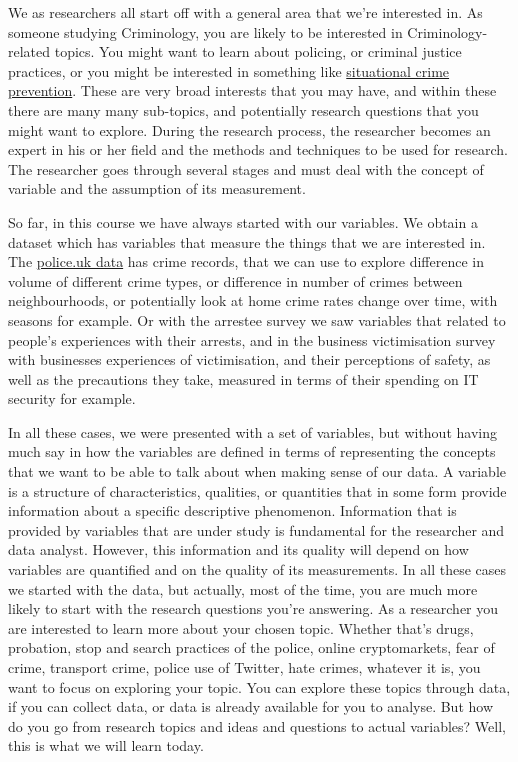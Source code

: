 \documentclass[
]{book}
\begin{document}
We as researchers all start off with a general area that we're interested in. As someone studying Criminology, you are likely to be interested in Criminology-related topics. You might want to learn about policing, or criminal justice practices, or you might be interested in something like \href{http://criminology.oxfordre.com/view/10.1093/acrefore/9780190264079.001.0001/acrefore-9780190264079-e-3}{situational crime prevention}. These are very broad interests that you may have, and within these there are many many sub-topics, and potentially research questions that you might want to explore. During the research process, the researcher becomes an expert in his or her field and the methods and techniques to be used for research. The researcher goes through several stages and must deal with the concept of variable and the assumption of its measurement.

So far, in this course we have always started with our variables. We obtain a dataset which has variables that measure the things that we are interested in. The \href{https://data.police.uk/}{police.uk data} has crime records, that we can use to explore difference in volume of different crime types, or difference in number of crimes between neighbourhoods, or potentially look at home crime rates change over time, with seasons for example. Or with the arrestee survey we saw variables that related to people's experiences with their arrests, and in the business victimisation survey with businesses experiences of victimisation, and their perceptions of safety, as well as the precautions they take, measured in terms of their spending on IT security for example.

In all these cases, we were presented with a set of variables, but without having much say in how the variables are defined in terms of representing the concepts that we want to be able to talk about when making sense of our data. A variable is a structure of characteristics, qualities, or quantities that in some form provide information about a specific descriptive phenomenon. Information that is provided by variables that are under study is fundamental for the researcher and data analyst. However, this information and its quality will depend on how variables are quantified and on the quality of its measurements. In all these cases we started with the data, but actually, most of the time, you are much more likely to start with the research questions you're answering. As a researcher you are interested to learn more about your chosen topic. Whether that's drugs, probation, stop and search practices of the police, online cryptomarkets, fear of crime, transport crime, police use of Twitter, hate crimes, whatever it is, you want to focus on exploring your topic. You can explore these topics through data, if you can collect data, or data is already available for you to analyse. But how do you go from research topics and ideas and questions to actual variables? Well, this is what we will learn today.
\end{document}
